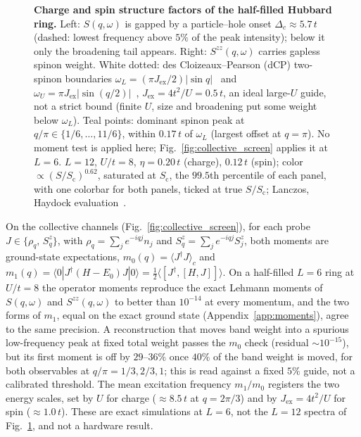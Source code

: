 \documentclass[submission, PhysCore]{SciPost}
\begin{document}
\begin{appendix}
\begin{figure}[t]
\centering
{}
\caption{\textbf{Charge and spin structure factors of the half-filled Hubbard ring.} Left: $S(q,\omega)$ is gapped by a particle--hole onset $\Delta_c\approx5.7\,t$ (dashed: lowest frequency above $5\%$ of the peak intensity); below it only the broadening tail appears. Right: $S^{zz}(q,\omega)$ carries gapless spinon weight. White dotted: des Cloizeaux--Pearson (dCP) two-spinon boundaries $\omega_L=(\pi J_{\mathrm{ex}}/2)|\sin q|$~\cite{desCloizeauxPearson1962} and $\omega_U=\pi J_{\mathrm{ex}}|\sin(q/2)|$~\cite{Muller1981}, $J_{\mathrm{ex}}=4t^2/U=0.5\,t$, an ideal large-$U$ guide, not a strict bound (finite $U$, size and broadening put some weight below $\omega_L$). Teal points: dominant spinon peak at $q/\pi\in\{1/6,\dots,11/6\}$, within $0.17\,t$ of $\omega_L$ (largest offset at $q=\pi$). No moment test is applied here; Fig.~\ref{fig:collective_screen} applies it at $L=6$. $L=12$, $U/t=8$, $\eta=0.20\,t$ (charge), $0.12\,t$ (spin); color $\propto(S/S_{\mathrm c})^{0.62}$, saturated at $S_{\mathrm c}$, the $99.5$th percentile of each panel, with one colorbar for both panels, ticked at true $S/S_{\mathrm c}$; Lanczos, Haydock evaluation~\cite{Haydock1972,Lanczos1950}.}
\label{fig:sqw}
\end{figure}

On the collective channels (Fig.~\ref{fig:collective_screen}), for each probe $J\in\{\rho_q,\,S^z_q\}$, with $\rho_q=\sum_j e^{-iqj}n_j$ and $S^z_q=\sum_j e^{-iqj}S^z_j$, both moments are ground-state expectations, $m_0(q)=\langle J^\dagger J\rangle_c$ and $m_1(q)={\langle 0|J^\dagger(H-E_0)J|0\rangle}={\tfrac12\langle[J^\dagger,[H,J]]\rangle}$. On a half-filled $L=6$ ring at $U/t=8$ the operator moments reproduce the exact Lehmann moments of $S(q,\omega)$ and $S^{zz}(q,\omega)$ to better than $10^{-14}$ at every momentum, and the two forms of $m_1$, equal on the exact ground state (Appendix~\ref{app:moments}), agree to the same precision. A reconstruction that moves band weight into a spurious low-frequency peak at fixed total weight passes the $m_0$ check (residual $\sim\!10^{-15}$), but its first moment is off by $29$--$36\%$ once $40\%$ of the band weight is moved, for both observables at $q/\pi=1/3,2/3,1$; this is read against a fixed $5\%$ guide, not a calibrated threshold. The mean excitation frequency $m_1/m_0$ registers the two energy scales, set by $U$ for charge ($\approx8.5\,t$ at $q=2\pi/3$) and by $J_{\mathrm{ex}}=4t^2/U$ for spin ($\approx1.0\,t$). These are exact simulations at $L=6$, not the $L=12$ spectra of Fig.~\ref{fig:sqw}, and not a hardware result.


\end{appendix}
\end{document}

